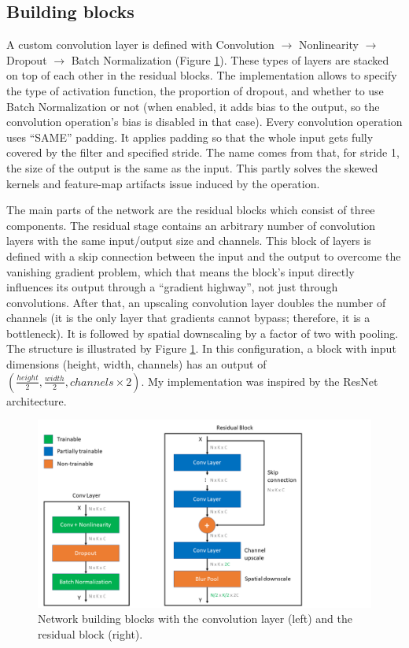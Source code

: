 \subsection{Building blocks}

A custom convolution layer is defined with Convolution $\rightarrow$ Nonlinearity $\rightarrow$ Dropout $\rightarrow$ Batch Normalization (Figure \ref{fig:blocks}). These types of layers are stacked on top of each other in the residual blocks. The implementation allows to specify the type of activation function, the proportion of dropout, and whether to use Batch Normalization or not (when enabled, it adds bias to the output, so the convolution operation's bias is disabled in that case). Every convolution operation uses ``SAME'' padding. It applies padding so that the whole input gets fully covered by the filter and specified stride. The name comes from that, for stride 1, the size of the output is the same as the input. This partly solves the skewed kernels and feature-map artifacts issue induced by the operation\cite{PadBlindSpot}.

The main parts of the network are the residual blocks which consist of three components. The residual stage contains an arbitrary number of convolution layers with the same input/output size and channels. This block of layers is defined with a skip connection between the input and the output to overcome the vanishing gradient problem, which that means the block's input directly influences its output through a ``gradient highway'', not just through convolutions. After that, an upscaling convolution layer doubles the number of channels (it is the only layer that gradients cannot bypass; therefore, it is a bottleneck). It is followed by spatial downscaling by a factor of two with pooling. The structure is illustrated by Figure \ref{fig:blocks}. In this configuration, a block with input dimensions (height, width, channels) has an output of \((\frac{height}{2}, \frac{width}{2}, channels\times2)\). My implementation was inspired by the ResNet\cite{ResNet} architecture.

\begin{figure}[htb]
 \centerline{\includegraphics[width=1.0\columnwidth]{.//Figure/OCR/blocks.png}}
 \caption{Network building blocks with the convolution layer (left) and the residual block (right).}
 \label{fig:blocks}
\end{figure}

